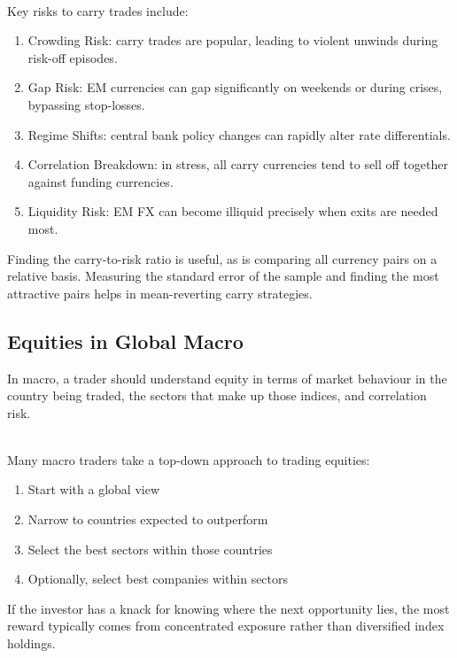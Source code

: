 \begin{remark} \\
Key risks to carry trades include:
\begin{enumerate}[label=\roman*.]
\setlength{\itemsep}{0pt}
\item Crowding Risk: carry trades are popular, leading to violent unwinds during risk-off episodes.
\item Gap Risk: EM currencies can gap significantly on weekends or during crises, bypassing stop-losses.
\item Regime Shifts: central bank policy changes can rapidly alter rate differentials.
\item Correlation Breakdown: in stress, all carry currencies tend to sell off together against funding currencies.
\item Liquidity Risk: EM FX can become illiquid precisely when exits are needed most.
\end{enumerate}
Finding the carry-to-risk ratio is useful, as is comparing all currency pairs on a relative basis. Measuring the standard error of the sample and finding the most attractive pairs helps in mean-reverting carry strategies.
\end{remark}


\subsection{Equities in Global Macro}

In macro, a trader should understand equity in terms of market behaviour in the country being traded, the sectors that make up those indices, and correlation risk.

\begin{remark} \\
Many macro traders take a top-down approach to trading equities:
\begin{enumerate}[label=\roman*.]
\setlength{\itemsep}{0pt}
\item Start with a global view
\item Narrow to countries expected to outperform
\item Select the best sectors within those countries
\item Optionally, select best companies within sectors
\end{enumerate}
If the investor has a knack for knowing where the next opportunity lies, the most reward typically comes from concentrated exposure rather than diversified index holdings.
\end{remark}

